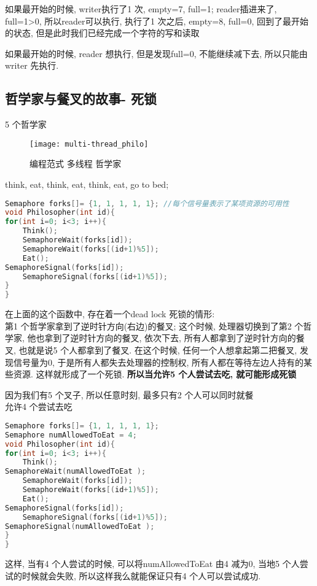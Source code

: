 \documentclass{article}
\begin{document}
如果最开始的时候, writer执行了1 次, empty=7, full=1; reader插进来了, full=1>0, 所以reader可以执行, 执行了1 次之后, empty=8, full=0, 回到了最开始的状态, 但是此时我们已经完成一个字符的写和读取

如果最开始的时候, reader 想执行, 但是发现full=0, 不能继续减下去, 所以只能由writer 先执行.

\subsection{哲学家与餐叉的故事- 死锁}
5 个哲学家
\begin{figure}[htbp]
	\centering
	\texttt{[image: multi-thread\_philo]}\\
	\caption{编程范式 多线程 哲学家}\label{fig.multi-thread.philo}
\end{figure}

think, eat, think, eat, think, eat, go to bed;
\begin{lstlisting}[language = C]
Semaphore forks[]= {1, 1, 1, 1, 1}; //每个信号量表示了某项资源的可用性
void Philosopher(int id){
for(int i=0; i<3; i++){
	Think();
	SemaphoreWait(forks[id]);
	SemaphoreWait(forks[(id+1)%5]);
	Eat();
SemaphoreSignal(forks[id]);
	SemaphoreSignal(forks[(id+1)%5]);
}
}
\end{lstlisting}
在上面的这个函数中, 存在着一个dead lock 死锁的情形:\\
第1 个哲学家拿到了逆时针方向(右边)的餐叉; 这个时候, 处理器切换到了第2 个哲学家, 他也拿到了逆时针方向的餐叉, 依次下去, 所有人都拿到了逆时针方向的餐叉, 也就是说5 个人都拿到了餐叉. 在这个时候, 任何一个人想拿起第二把餐叉, 发现信号量为0, 于是所有人都失去处理器的控制权, 所有人都在等待左边人持有的某些资源. 这样就形成了一个死锁.
\textbf{所以当允许5 个人尝试去吃, 就可能形成死锁}

因为我们有5 个叉子, 所以任意时刻, 最多只有2 个人可以同时就餐\\
允许4 个尝试去吃
\begin{lstlisting}[language = C]
Semaphore forks[]= {1, 1, 1, 1, 1};
Semaphore numAllowedToEat = 4;
void Philosopher(int id){
for(int i=0; i<3; i++){
	Think();
SemaphoreWait(numAllowedToEat );
	SemaphoreWait(forks[id]);
	SemaphoreWait(forks[(id+1)%5]);
	Eat();
SemaphoreSignal(forks[id]);
	SemaphoreSignal(forks[(id+1)%5]);
SemaphoreSignal(numAllowedToEat );
}
}
\end{lstlisting}
这样, 当有4 个人尝试的时候, 可以将numAllowedToEat 由4 减为0, 当地5 个人尝试的时候就会失败, 所以这样我么就能保证只有4 个人可以尝试成功.
\end{document}

